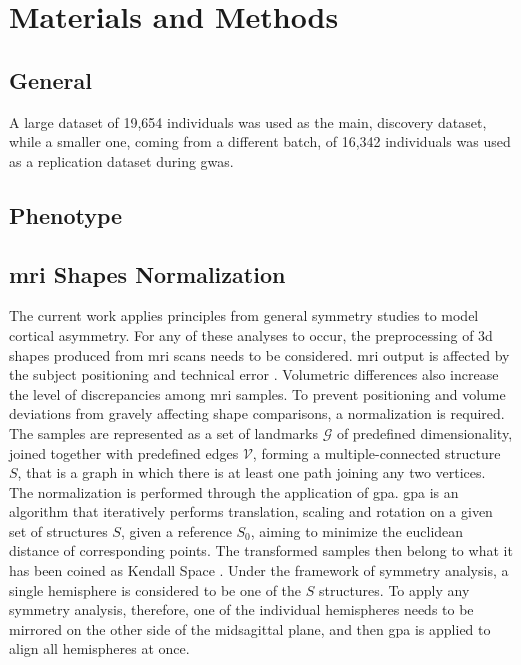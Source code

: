 \chapter{Materials and Methods}\label{chap:mat_and_methods}
\section{General}
A large dataset of 19,654 individuals was used as the main, discovery dataset, while a smaller one, coming from a different batch, of 16,342 individuals was used as a replication dataset during \ac{gwas}.
\section{Phenotype}
\section{\ac{mri} Shapes Normalization}\label{subsec:shape_normalization}
The current work applies principles from general symmetry studies to model cortical asymmetry. For any of these analyses to occur, the preprocessing of \ac{3d} shapes produced from \ac{mri} scans needs to be considered. \Ac{mri} output is affected by the subject positioning and technical error \cite{Wittens2021}.  Volumetric differences also increase the level of discrepancies among \ac{mri} samples.  To prevent positioning and volume deviations from gravely affecting shape comparisons, a normalization is required\cite{Klingenberg2020}. The samples are represented as a set of landmarks $\mathcal{G}$ of predefined dimensionality, joined together with predefined edges $\mathcal{V}$, forming a multiple-connected structure $S$, that is a graph in which there is at least one path joining any two vertices. The normalization is performed through the application of \ac{gpa}. \Ac{gpa} is an algorithm that iteratively performs translation, scaling and rotation on a given set of structures $S$, given a reference $S_0$, aiming to minimize the euclidean distance of corresponding points. The transformed samples then belong to what it has been coined as Kendall Space \cite{Klingenberg2020}. Under the framework of symmetry analysis, a single hemisphere is considered to be one of the $S$ structures. To apply any symmetry analysis, therefore, one of the individual hemispheres needs to be mirrored on the other side of the midsagittal plane, and then \ac{gpa} is applied to align all hemispheres at once.

